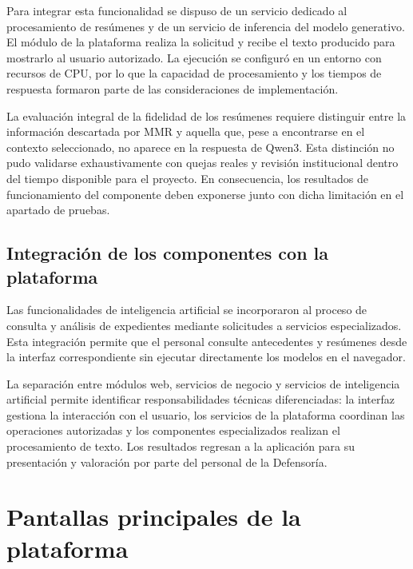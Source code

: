Para integrar esta funcionalidad se dispuso de un servicio dedicado al procesamiento de resúmenes y de un servicio de inferencia del modelo generativo. El módulo de la plataforma realiza la solicitud y recibe el texto producido para mostrarlo al usuario autorizado. La ejecución se configuró en un entorno con recursos de CPU, por lo que la capacidad de procesamiento y los tiempos de respuesta formaron parte de las consideraciones de implementación.


La evaluación integral de la fidelidad de los resúmenes requiere distinguir entre la información descartada por MMR y aquella que, pese a encontrarse en el contexto seleccionado, no aparece en la respuesta de Qwen3. Esta distinción no pudo validarse exhaustivamente con quejas reales y revisión institucional dentro del tiempo disponible para el proyecto. En consecuencia, los resultados de funcionamiento del componente deben exponerse junto con dicha limitación en el apartado de pruebas.

\subsection{Integración de los componentes con la plataforma}
\label{subsec:integracion_ia}

Las funcionalidades de inteligencia artificial se incorporaron al proceso de consulta y análisis de expedientes mediante solicitudes a servicios especializados. Esta integración permite que el personal consulte antecedentes y resúmenes desde la interfaz correspondiente sin ejecutar directamente los modelos en el navegador.

La separación entre módulos web, servicios de negocio y servicios de inteligencia artificial permite identificar responsabilidades técnicas diferenciadas: la interfaz gestiona la interacción con el usuario, los servicios de la plataforma coordinan las operaciones autorizadas y los componentes especializados realizan el procesamiento de texto. Los resultados regresan a la aplicación para su presentación y valoración por parte del personal de la Defensoría.

\section{Pantallas principales de la plataforma}
\label{sec:pantallas}

